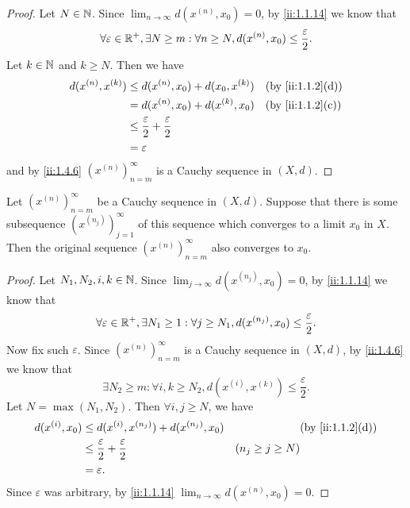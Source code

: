 \begin{proof}
  Let \(N \in \mathbb{N}\).
  Since \(\lim_{n \to \infty} d(x^{(n)}, x_0) = 0\), by \cref{ii:1.1.14} we know that
  \[
    \forall \varepsilon \in \mathbb{R}^+, \exists N \geq m : \forall n \geq N, d(x^{(n)}, x_0) \leq \dfrac{\varepsilon}{2}.
  \]
  Let \(k \in \mathbb{N}\) and \(k \geq N\).
  Then we have
  \begin{align*}
    d(x^{(n)}, x^{(k)}) & \leq d(x^{(n)}, x_0) + d(x_0, x^{(k)})               &  & \by{ii:1.1.2}[d] \\
                        & = d(x^{(n)}, x_0) + d(x^{(k)}, x_0)                  &  & \by{ii:1.1.2}[c] \\
                        & \leq \dfrac{\varepsilon}{2} + \dfrac{\varepsilon}{2}                       \\
                        & = \varepsilon
  \end{align*}
  and by \cref{ii:1.4.6} \((x^{(n)})_{n = m}^\infty\) is a Cauchy sequence in \((X, d)\).
\end{proof}

\setcounter{thm}{8}
\begin{lem}\label{ii:1.4.9}
  Let \((x^{(n)})_{n = m}^\infty\) be a Cauchy sequence in \((X, d)\).
  Suppose that there is some subsequence \((x^{(n_j)})_{j = 1}^\infty\) of this sequence which converges to a limit \(x_0\) in \(X\).
  Then the original sequence \((x^{(n)})_{n = m}^\infty\) also converges to \(x_0\).
\end{lem}

\begin{proof}
  Let \(N_1, N_2, i, k \in \mathbb{N}\).
  Since \(\lim_{j \to \infty} d(x^{(n_j)}, x_0) = 0\), by \cref{ii:1.1.14} we know that
  \[
    \forall \varepsilon \in \mathbb{R}^+, \exists N_1 \geq 1 : \forall j \geq N_1, d(x^{(n_j)}, x_0) \leq \dfrac{\varepsilon}{2}.
  \]
  Now fix such \(\varepsilon\).
  Since \((x^{(n)})_{n = m}^\infty\) is a Cauchy sequence in \((X, d)\), by \cref{ii:1.4.6} we know that
  \[
    \exists N_2 \geq m : \forall i, k \geq N_2, d(x^{(i)}, x^{(k)}) \leq \dfrac{\varepsilon}{2}.
  \]
  Let \(N = \max(N_1, N_2)\).
  Then \(\forall i, j \geq N\), we have
  \begin{align*}
    d(x^{(i)}, x_0) & \leq d(x^{(i)}, x^{(n_j)}) + d(x^{(n_j)}, x_0)       &                     & \by{ii:1.1.2}[d] \\
                    & \leq \dfrac{\varepsilon}{2} + \dfrac{\varepsilon}{2} & (n_j \geq j \geq N)                    \\
                    & = \varepsilon.
  \end{align*}
  Since \(\varepsilon\) was arbitrary, by \cref{ii:1.1.14} \(\lim_{n \to \infty} d(x^{(n)}, x_0) = 0\).
\end{proof}

